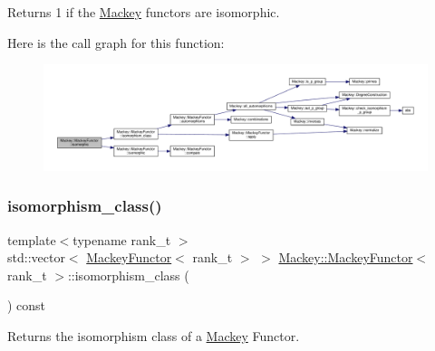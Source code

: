 Returns 1 if the \hyperlink{namespaceMackey}{Mackey} functors are isomorphic. 

Here is the call graph for this function\+:\nopagebreak
\begin{figure}[H]
\begin{center}
\leavevmode
\includegraphics[width=350pt]{classMackey_1_1MackeyFunctor_af183c1f4d1558bc3c7dc75dcf8161ee8_cgraph}
\end{center}
\end{figure}
\mbox{\label{classMackey_1_1MackeyFunctor_a71e081ee78f53fe74e8f65106865f4c5}} 
\subsubsection{\texorpdfstring{isomorphism\+\_\+class()}{isomorphism\_class()}}
{\footnotesize\ttfamily template$<$typename rank\+\_\+t $>$ \\
std\+::vector$<$ \hyperlink{classMackey_1_1MackeyFunctor}{Mackey\+Functor}$<$ rank\+\_\+t $>$ $>$ \hyperlink{classMackey_1_1MackeyFunctor}{Mackey\+::\+Mackey\+Functor}$<$ rank\+\_\+t $>$\+::isomorphism\+\_\+class (\begin{DoxyParamCaption}{ }\end{DoxyParamCaption}) const}



Returns the isomorphism class of a \hyperlink{namespaceMackey}{Mackey} Functor. 

